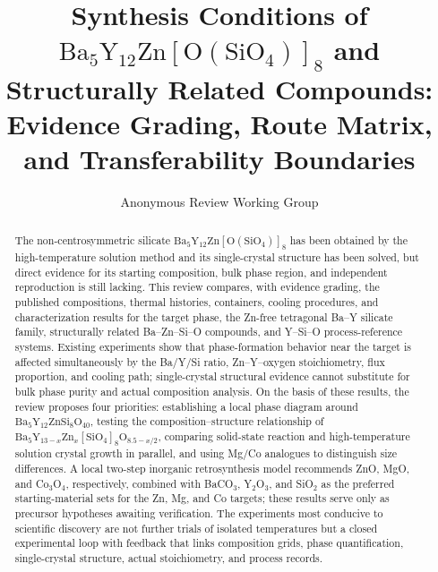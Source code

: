 \documentclass[10pt]{article}
\title{Synthesis Conditions of $\mathrm{Ba_5Y_{12}Zn[O(SiO_4)]_8}$ and Structurally Related Compounds:\\
Evidence Grading, Route Matrix, and Transferability Boundaries}
\author{Anonymous Review Working Group}
\date{}
\begin{document}
\maketitle

\begin{abstract}
The non-centrosymmetric silicate $\mathrm{Ba_5Y_{12}Zn[O(SiO_4)]_8}$ has been obtained by the high-temperature solution method and its single-crystal structure has been solved, but direct evidence for its starting composition, bulk phase region, and independent reproduction is still lacking. This review compares, with evidence grading, the published compositions, thermal histories, containers, cooling procedures, and characterization results for the target phase, the Zn-free tetragonal Ba--Y silicate family, structurally related Ba--Zn--Si--O compounds, and Y--Si--O process-reference systems. Existing experiments show that phase-formation behavior near the target is affected simultaneously by the Ba/Y/Si ratio, Zn--Y--oxygen stoichiometry, flux proportion, and cooling path; single-crystal structural evidence cannot substitute for bulk phase purity and actual composition analysis. On the basis of these results, the review proposes four priorities: establishing a local phase diagram around $\mathrm{Ba_5Y_{12}ZnSi_8O_{40}}$, testing the composition--structure relationship of $\mathrm{Ba_5Y_{13-\mathit{x}}Zn_{\mathit{x}}[SiO_4]_8O_{8.5-\mathit{x}/2}}$, comparing solid-state reaction and high-temperature solution crystal growth in parallel, and using Mg/Co analogues to distinguish size differences. A local two-step inorganic retrosynthesis model recommends ZnO, MgO, and Co$_3$O$_4$, respectively, combined with BaCO$_3$, Y$_2$O$_3$, and SiO$_2$ as the preferred starting-material sets for the Zn, Mg, and Co targets; these results serve only as precursor hypotheses awaiting verification. The experiments most conducive to scientific discovery are not further trials of isolated temperatures but a closed experimental loop with feedback that links composition grids, phase quantification, single-crystal structure, actual stoichiometry, and process records.
\end{abstract}















\end{document}

